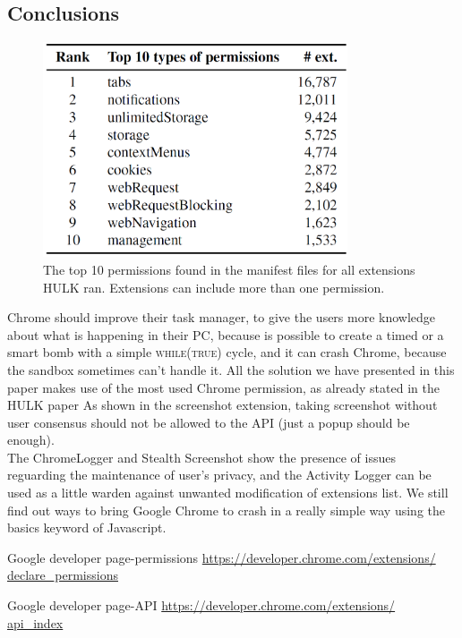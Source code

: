 \documentclass[12pt]{article}
\begin{document}
\begin{multicols}{2}
\section*{Conclusions}
\begin{figure}[H]
	\begin{center}
		\includegraphics[width=9cm]{permission.png}
		\caption{The top 10 permissions found in the manifest
			files for all extensions HULK ran. Extensions can include			
			more than one permission.}
	\end{center}
\end{figure}
Chrome should improve their task manager, to give the users more knowledge about what is happening in their PC, because is possible to create a timed or a smart bomb with a simple \textsc{while(true)} cycle, and it can crash Chrome, because the sandbox sometimes can't handle it.
All the solution we have presented in this paper makes use of the most used Chrome permission, as already stated in the HULK paper \cite{HULK}
As shown in the screenshot extension, taking screenshot without user consensus should not be allowed to the API (just a popup should be enough). \\
The ChromeLogger and Stealth Screenshot show the presence of issues reguarding the maintenance of user's privacy, and the Activity Logger can be used as a little warden against unwanted modification of extensions list. We still find out ways to bring Google Chrome to crash in a really simple way using the basics keyword of Javascript.

\begin{thebibliography}{4}
	Google developer page-permissions
	\href{https://developer.chrome.com/extensions/declare_permissions}{https://developer.chrome.com/extensions/\\declare\_permissions}
	
	Google developer page-API
	\href{https://developer.chrome.com/extensions/api_index}{https://developer.chrome.com/extensions/\\api\_index}
	

\end{thebibliography}
\end{multicols}
\end{document}
